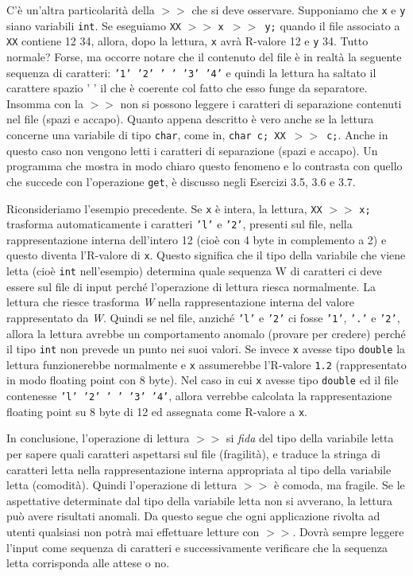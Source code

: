 \begin{itemize}
\noindent C'è un'altra particolarità della $>>$ che si deve osservare.
Supponiamo che \texttt{x} e \texttt{y} siano variabili \texttt{int}.
Se eseguiamo \texttt{XX} $>>$ \texttt{x $>>$ y;} quando il file associato a \texttt{XX} contiene 12 34, allora, dopo la lettura, \texttt{x} avrà R-valore 12 e \texttt{y} 34.
Tutto normale? Forse, ma occorre notare che il contenuto del file è in realtà la seguente sequenza di caratteri: \texttt{'1' '2' ' ' '3' '4'} e quindi la lettura ha saltato il carattere spazio ' ' il che è coerente col fatto che esso funge da separatore.
Insomma con la $>>$ non si possono leggere i caratteri di separazione contenuti nel file (spazi e accapo).
Quanto appena descritto è vero anche se la lettura concerne una variabile di tipo \texttt{char}, come in, \texttt{char c; XX $>>$ c;}.
Anche in questo caso non vengono letti i caratteri di separazione (spazi e accapo).
Un programma che mostra in modo chiaro questo fenomeno e lo contrasta con quello che succede con l'operazione \texttt{get}, è discusso negli Esercizi 3.5, 3.6 e 3.7.

\noindent Riconsideriamo l'esempio precedente.
Se \texttt{x} è intera, la lettura, \texttt{XX} $>>$ \texttt{x;} trasforma automaticamente i caratteri \texttt{'l'} e \texttt{'2'}, presenti sul file, nella rappresentazione interna dell'intero 12 (cioè con 4 byte in complemento a 2) e questo diventa l'R-valore di \texttt{x}.
Questo significa che il tipo della variabile che viene letta (cioè \texttt{int} nell'esempio) determina quale sequenza W di caratteri ci deve essere sul file di input perché l'operazione di lettura riesca normalmente.
La lettura che riesce trasforma \textit{W} nella rappresentazione interna del valore rappresentato da \textit{W}.
Quindi se nel file, anziché \texttt{'l'} e \texttt{'2'} ci fosse \texttt{'1'}, \texttt{'.'} e \texttt{'2'}, allora la lettura avrebbe un comportamento anomalo (provare per credere) perché il tipo \texttt{int} non prevede un punto nei suoi valori.
Se invece \texttt{x} avesse tipo \texttt{double} la lettura funzionerebbe normalmente e \texttt{x} assumerebbe l'R-valore \texttt{1.2} (rappresentato in modo floating point con 8 byte).
Nel caso in cui \texttt{x} avesse tipo \texttt{double} ed il file contenesse \texttt{'l' '2' ' ' '3' '4'}, allora verrebbe calcolata la rappresentazione floating point su 8 byte di 12 ed assegnata come R-valore a \texttt{x}.

\noindent In conclusione, l'operazione di lettura $>>$ si \textit{fida} del tipo della variabile letta per sapere quali caratteri aspettarsi sul file (fragilità), e traduce la stringa di caratteri letta nella rappresentazione interna appropriata al tipo della variabile letta (comodità).
Quindi l'operazione di lettura $>>$ è comoda, ma fragile.
Se le aspettative determinate dal tipo della variabile letta non si avverano, la lettura può avere risultati anomali.
Da questo segue che ogni applicazione rivolta ad utenti qualsiasi non potrà mai effettuare letture con $>>$.
Dovrà sempre leggere l'input come sequenza di caratteri e successivamente verificare che la sequenza letta corrisponda alle attese o no.


\end{itemize}
